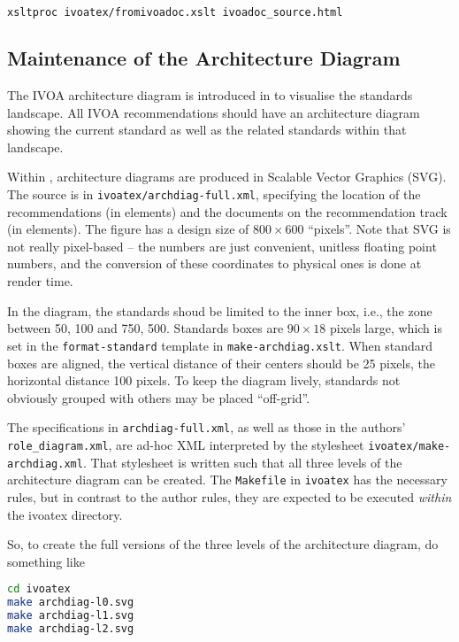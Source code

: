 \documentclass[11pt,a4paper]{ivoa}
\begin{document}
\begin{lstlisting}[language=sh]
xsltproc ivoatex/fromivoadoc.xslt ivoadoc_source.html
\end{lstlisting}

\subsection{Maintenance of the Architecture Diagram}

The IVOA architecture diagram is introduced in
\citet{2010ivoa.rept.1123A} to
visualise the standards landscape.  All IVOA recommendations should have
an architecture diagram showing the current standard as well as the
related standards within that landscape.

Within \ivoatex, architecture diagrams are produced in Scalable Vector
Graphics (SVG).  The source is in \texttt{ivoatex/archdiag-full.xml},
specifying the location of the recommendations (in  elements)
and the documents on the recommendation track (in 
elements).  The figure has a design size of $800\times 600$ ``pixels''.
Note that SVG is not really pixel-based -- the numbers are just
convenient, unitless floating point numbers, and the conversion of these
coordinates to physical ones is done at render time.

In the diagram, the standards shoud be limited to the inner box, i.e.,
the zone between 50, 100 and 750, 500.  Standards boxes are $90\times
18$ pixels large, which is set in the \texttt{format-standard} template
in \texttt{make-archdiag.xslt}.  When standard boxes are aligned, the
vertical distance of their centers should be 25 pixels, the horizontal
distance 100 pixels.  To keep the diagram lively, standards not
obviously grouped with others may be placed ``off-grid''.

The specifications in \texttt{archdiag-full.xml}, as well as those in
the authors' \texttt{role\_diagram.xml}, are ad-hoc XML interpreted by the
stylesheet \texttt{ivoatex/make-archdiag.xml}.  That stylesheet is
written such that all three levels of the architecture diagram can be
created.  The \texttt{Makefile} in \texttt{ivoatex} has the necessary
rules, but in contrast to the author rules, they are expected to be
executed \emph{within} the ivoatex directory.

So, to create the full versions of the three levels of the architecture
diagram, do something like

\begin{lstlisting}[language=sh]
cd ivoatex
make archdiag-l0.svg
make archdiag-l1.svg
make archdiag-l2.svg
\end{lstlisting}
\end{document}
